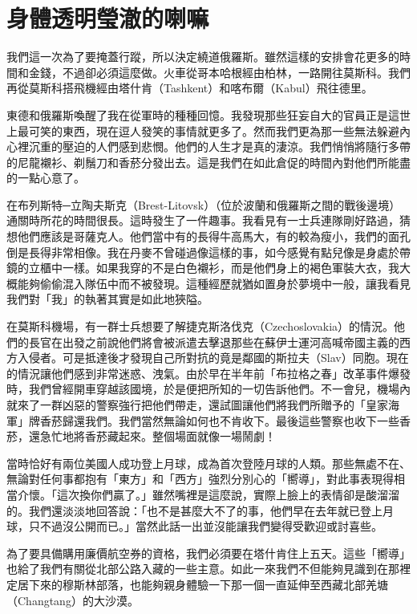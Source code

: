 \chapter{身體透明瑩澈的喇嘛}

我們這一次為了要掩蓋行蹤，所以決定繞道俄羅斯。雖然這樣的安排會花更多的時間和金錢，不過卻必須這麼做。火車從哥本哈根經由柏林，一路開往莫斯科。我們再從莫斯科搭飛機經由塔什肯（Tashkent）和喀布爾（Kabul）飛往德里。

東德和俄羅斯喚醒了我在從軍時的種種回憶。我發現那些狂妄自大的官員正是這世上最可笑的東西，現在逗人發笑的事情就更多了。然而我們更為那一些無法躲避內心裡沉重的壓迫的人們感到悲憫。他們的人生才是真的淒涼。我們悄悄將隨行多帶的尼龍襯衫、剃鬚刀和香菸分發出去。這是我們在如此倉促的時間內對他們所能盡的一點心意了。

在布列斯特\textbf{─}立陶夫斯克（Brest-Litovsk）（位於波蘭和俄羅斯之間的戰後邊境）通關時所花的時間很長。這時發生了一件趣事。我看見有一士兵連隊剛好路過，猜想他們應該是哥薩克人。他們當中有的長得牛高馬大，有的較為瘦小，我們的面孔倒是長得非常相像。我在丹麥不曾碰過像這樣的事，如今感覺有點兒像是身處於帶鏡的立櫃中一樣。如果我穿的不是白色襯衫，而是他們身上的褐色軍裝大衣，我大概能夠偷偷混入隊伍中而不被發現。這種經歷就猶如置身於夢境中一般，讓我看見我們對「我」的執著其實是如此地狹隘。

在莫斯科機場，有一群士兵想要了解捷克斯洛伐克（Czechoslovakia）的情況。他們的長官在出發之前說他們將會被派遣去擊退那些在蘇伊士運河高喊帝國主義的西方入侵者。可是抵達後才發現自己所對抗的竟是鄰國的斯拉夫（Slav）同胞。現在的情況讓他們感到非常迷惑、洩氣。由於早在半年前「布拉格之春」改革事件爆發時，我們曾經開車穿越該國境，於是便把所知的一切告訴他們。不一會兒，機場內就來了一群凶惡的警察強行把他們帶走，還試圖讓他們將我們所贈予的「皇家海軍」牌香菸歸還我們。我們當然無論如何也不肯收下。最後這些警察也收下一些香菸，還急忙地將香菸藏起來。整個場面就像一場鬧劇！

當時恰好有兩位美國人成功登上月球，成為首次登陸月球的人類。那些無處不在、無論對任何事都抱有「東方」和「西方」強烈分別心的「嚮導」，對此事表現得相當介懷。「這次換你們贏了。」雖然嘴裡是這麼說，實際上臉上的表情卻是酸溜溜的。我們還淡淡地回答說：「也不是甚麼大不了的事，他們早在去年就已登上月球，只不過沒公開而已。」當然此話一出並沒能讓我們變得受歡迎或討喜些。

為了要具備購用廉價航空券的資格，我們必須要在塔什肯住上五天。這些「嚮導」也給了我們有關從北部公路入藏的一些主意。如此一來我們不但能夠見識到在那裡定居下來的穆斯林部落，也能夠親身體驗一下那一個一直延伸至西藏北部羌塘（Changtang）的大沙漠。

